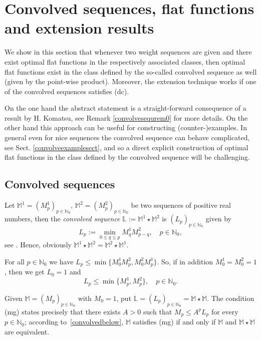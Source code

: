 \documentclass[11pt,a4paper]{article}
\theoremstyle{plain}
\theoremstyle{definition}
\newcommand{\N}{\mathbb{N}}
\newcommand{\M}{\mathbb{M}}
\def\L{\mathbb{L}}
\begin{document}
\section{Convolved sequences, flat functions and extension results}

We show in this section that whenever two weight sequences are given and there exist optimal flat functions in the respectively associated classes, then optimal flat functions exist in the class defined by the so-called convolved sequence as well (given by the point-wise product). Moreover, the extension technique works if one of the convolved sequences satisfies (dc).\vspace{6pt}

On the one hand the abstract statement is a straight-forward consequence of a result by H. Komatsu, see Remark \ref{convolvesequrem0} for more details. On the other hand this approach can be useful for constructing (counter-)examples. In general even for nice sequences the convolved sequence can behave complicated, see Sect. \ref{convolveexamplesect}, and so a direct explicit construction of optimal flat functions in the class defined by the convolved sequence will be challenging.

\subsection{Convolved sequences}

Let $\mathbb{M}^1=(M_p^1)_{p\in\N_0}$, $\mathbb{M}^2=(M_p^2)_{p\in\N_0}$ be two sequences of positive real numbers, then the \emph{convolved sequence} $\L:=\mathbb{M}^1\star\mathbb{M}^2$ is $(L_p)_{p\in\N_0}$ given by
\begin{equation*}
L_p:=\min_{0\le q\le p}M^1_qM^2_{p-q},\quad p\in\mathbb{N}_0,
\end{equation*}
see \cite[$(3.15)$]{komatsu}. Hence, obviously $\mathbb{M}^1\star\mathbb{M}^2=\mathbb{M}^2\star\mathbb{M}^1$.

For all $p\in\mathbb{N}_0$ we have $L_p\le\min\{M^1_0M^2_p,M^2_0M^1_p\}$. So, if in addition $M^1_0=M^2_0=1$, then we get $L_0=1$ and
\begin{equation}\label{convolvedbelow}
    L_p\le\min\{M^1_p,M^2_p\}, \quad p\in\N_0.
\end{equation}

Given $\M=(M_p)_{p\in\N_0}$ with $M_0=1$, put $\L=(L_p)_{p\in\N_0}=\M\star\M$. The condition (mg) states precisely that there exists $A>0$ such that $M_p\le A^p L_p$ for every $p\in\N_0$; according to~\eqref{convolvedbelow}, $\M$ satisfies (mg) if and only if $\M$ and $\M\star\M$ are equivalent.
\end{document}

